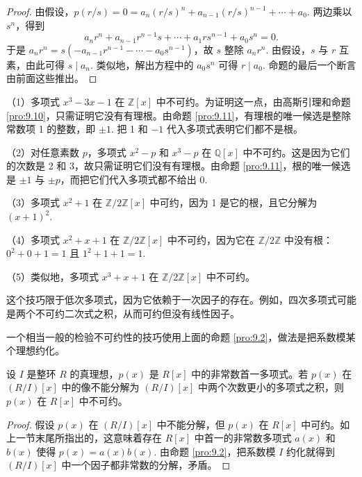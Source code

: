 \begin{proof}
由假设，\(p(r/s) = 0 = a_n(r/s)^n + a_{n-1}(r/s)^{n-1} + \cdots + a_0\). 两边乘以 \(s^n\)，得到
\[
a_nr^n + a_{n-1}r^{n-1}s + \cdots + a_1rs^{n-1} + a_0s^n = 0.
\]
于是 \(a_nr^n = s(-a_{n-1}r^{n-1} - \cdots - a_0s^{n-1})\)，故 \(s\) 整除 \(a_nr^n\). 由假设，\(s\) 与 \(r\) 互素，由此可得 \(s \mid a_n\). 类似地，解出方程中的 \(a_0s^n\) 可得 \(r \mid a_0\). 命题的最后一个断言由前面这些推出。
\end{proof}

\begin{example}
（1）多项式 \(x^3-3x-1\) 在 \(\mathbb{Z}[x]\) 中不可约。为证明这一点，由高斯引理和命题 \ref{pro:9.10}，只需证明它没有有理根。由命题 \ref{pro:9.11}，有理根的唯一候选是整除常数项 1 的整数，即 \(\pm 1\). 把 1 和 \(-1\) 代入多项式表明它们都不是根。

（2）对任意素数 \(p\)，多项式 \(x^2-p\) 和 \(x^3-p\) 在 \(\mathbb{Q}[x]\) 中不可约。这是因为它们的次数是 2 和 3，故只需证明它们没有有理根。由命题 \ref{pro:9.11}，根的唯一候选是 \(\pm 1\) 与 \(\pm p\)，而把它们代入多项式都不给出 0.

（3）多项式 \(x^2+1\) 在 \(\mathbb{Z}/2\mathbb{Z}[x]\) 中可约，因为 1 是它的根，且它分解为 \((x+1)^2\).

（4）多项式 \(x^2+x+1\) 在 \(\mathbb{Z}/2\mathbb{Z}[x]\) 中不可约，因为它在 \(\mathbb{Z}/2\mathbb{Z}\) 中没有根：\(0^2+0+1 = 1\) 且 \(1^2+1+1 = 1\).

（5）类似地，多项式 \(x^3+x+1\) 在 \(\mathbb{Z}/2\mathbb{Z}[x]\) 中不可约。
\end{example}

这个技巧限于低次多项式，因为它依赖于一次因子的存在。例如，四次多项式可能是两个不可约二次式之积，从而可约但没有线性因子。

一个相当一般的检验不可约性的技巧使用上面的命题 \ref{pro:9.2}，做法是把系数模某个理想约化。

\begin{proposition}\label{pro:9.12}
设 \(I\) 是整环 \(R\) 的真理想，\(p(x)\) 是 \(R[x]\) 中的非常数首一多项式。若 \(p(x)\) 在 \((R/I)[x]\) 中的像不能分解为 \((R/I)[x]\) 中两个次数更小的多项式之积，则 \(p(x)\) 在 \(R[x]\) 中不可约。
\end{proposition}

\begin{proof}
假设 \(p(x)\) 在 \((R/I)[x]\) 中不能分解，但 \(p(x)\) 在 \(R[x]\) 中可约。如上一节末尾所指出的，这意味着存在 \(R[x]\) 中首一的非常数多项式 \(a(x)\) 和 \(b(x)\) 使得 \(p(x) = a(x)b(x)\). 由命题 \ref{pro:9.2}，把系数模 \(I\) 约化就得到 \((R/I)[x]\) 中一个因子都非常数的分解，矛盾。
\end{proof}

